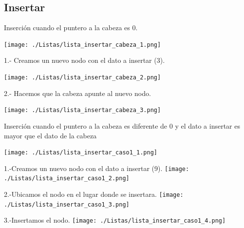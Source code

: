 \documentclass{beamer}
\begin{document}
\subsection{Insertar}
\begin{frame}
  
  Inserción cuando el puntero a la cabeza es 0.
        

 \texttt{[image: ./Listas/lista\_insertar\_cabeza\_1.png]}
 


\end{frame}


\begin{frame}
  
  1.- Creamos un nuevo nodo con el dato a insertar (3).
        

 \texttt{[image: ./Listas/lista\_insertar\_cabeza\_2.png]}
 


\end{frame}


\begin{frame}
  
  2.- Hacemos que la cabeza apunte al nuevo nodo.  

 \texttt{[image: ./Listas/lista\_insertar\_cabeza\_3.png]}


\end{frame}



\begin{frame}
  Inserción cuando el puntero a la cabeza es diferente de  0 y el dato a insertar es mayor que el dato de la cabeza
  
  \texttt{[image: ./Listas/lista\_insertar\_caso1\_1.png]}
  
\end{frame}

\begin{frame}
  1.-Creamos un nuevo nodo con el dato a insertar (9).
  \texttt{[image: ./Listas/lista\_insertar\_caso1\_2.png]}
  
\end{frame}

\begin{frame}
  2.-Ubicamos el nodo en el lugar donde se insertara.
  \texttt{[image: ./Listas/lista\_insertar\_caso1\_3.png]}
  
\end{frame}

\begin{frame}
  3.-Insertamos el nodo.
  \texttt{[image: ./Listas/lista\_insertar\_caso1\_4.png]}
\end{frame}
  
\end{document}
